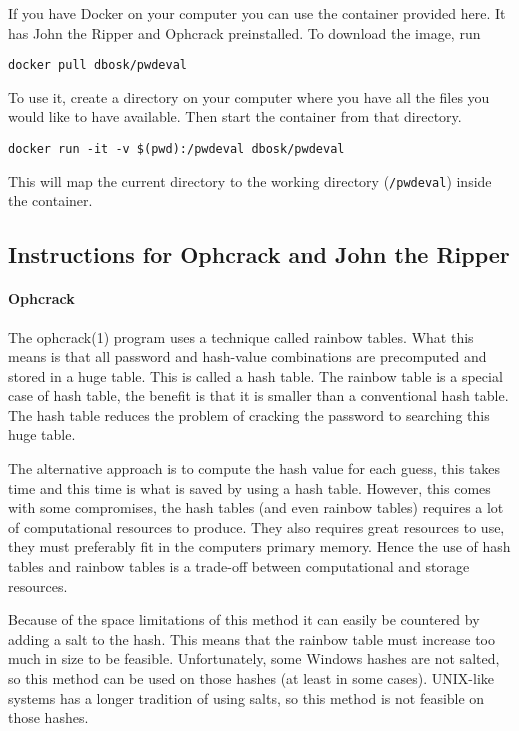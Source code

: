 If you have Docker on your computer you can use the container provided here.
It has John the Ripper and Ophcrack preinstalled.
To download the image, run
\begin{verbatim}
docker pull dbosk/pwdeval
\end{verbatim}

To use it, create a directory on your computer where you have all the files you 
would like to have available.
Then start the container from that directory.
\begin{verbatim}
docker run -it -v $(pwd):/pwdeval dbosk/pwdeval
\end{verbatim}
This will map the current directory to the working directory (\verb'/pwdeval') 
inside the container.


\subsection{Instructions for Ophcrack and John the Ripper}

\paragraph{Ophcrack}

The ophcrack(1) program uses a technique called rainbow tables.
What this means is that all password and hash-value combinations are 
precomputed and stored in a huge table.
This is called a hash table.
The rainbow table is a special case of hash table, the benefit is that it is 
smaller than a conventional hash table.
The hash table reduces the problem of cracking the password to searching this 
huge table.

The alternative approach is to compute the hash value for each guess, this 
takes time and this time is what is saved by using a hash table.
However, this comes with some compromises, the hash tables (and even rainbow 
tables) requires a lot of computational resources to produce.
They also requires great resources to use, they must preferably fit in the 
computers primary memory.
Hence the use of hash tables and rainbow tables is a trade-off between 
computational and storage resources.

Because of the space limitations of this method it can easily be countered by 
adding a salt to the hash.
This means that the rainbow table must increase too much in size to be 
feasible.
Unfortunately, some Windows hashes are not salted, so this method can be used 
on those hashes (at least in some cases).
UNIX-like systems has a longer tradition of using salts, so this method is not 
feasible on those hashes.

